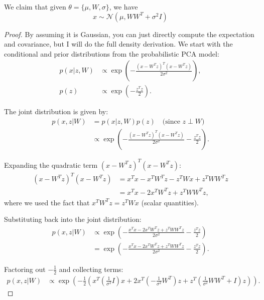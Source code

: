   \begin{lemma} 
    We claim that given $\theta = \{\mu, W, \sigma\}$, we have 
    \begin{equation}
      x \sim \mathcal{N}(\mu, W W^T + \sigma^2 I) 
    \end{equation} 
  \end{lemma}
  \begin{proof}
    By assuming it is Gaussian, you can just directly compute the expectation and covariance, but I will do the full density derivation. We start with the conditional and prior distributions from the probabilistic PCA model:
    \begin{align}
      p(x | z, W) &\propto \exp\left(-\frac{(x - W^T z)^T(x - W^T z)}{2\sigma^2}\right), \\
      p(z) &\propto \exp\left(-\frac{z^T z}{2}\right).
    \end{align}

    The joint distribution is given by:
    \begin{align}
      p(x, z | W) &= p(x | z, W)p(z) \quad \text{(since } z \perp W\text{)} \\
      &\propto \exp\left(-\frac{(x - W^T z)^T(x - W^T z)}{2\sigma^2} - \frac{z^T z}{2}\right).
    \end{align}

    Expanding the quadratic term $(x - W^T z)^T(x - W^T z)$:
    \begin{align}
      (x - W^T z)^T(x - W^T z) &= x^T x - x^T W^T z - z^T W x + z^T W W^T z \\
      &= x^T x - 2x^T W^T z + z^T W W^T z,
    \end{align}
    where we used the fact that $x^T W^T z = z^T W x$ (scalar quantities).

    Substituting back into the joint distribution:
    \begin{align}
      p(x, z | W) &\propto \exp\left(-\frac{x^T x - 2x^T W^T z + z^T W W^T z}{2\sigma^2} - \frac{z^T z}{2}\right) \\
      &= \exp\left(-\frac{x^T x - 2x^T W^T z + z^T W W^T z}{2\sigma^2} - \frac{z^T z}{2}\right).
    \end{align}

    Factoring out $-\frac{1}{2}$ and collecting terms:
    \begin{align}
      p(x, z | W) &\propto \exp\left(-\frac{1}{2}\left(x^T\left(\frac{1}{\sigma^2}I\right)x + 2x^T\left(-\frac{1}{\sigma^2}W^T\right)z + z^T\left(\frac{1}{\sigma^2}WW^T + I\right)z\right)\right).
    \end{align}


\end{proof}
